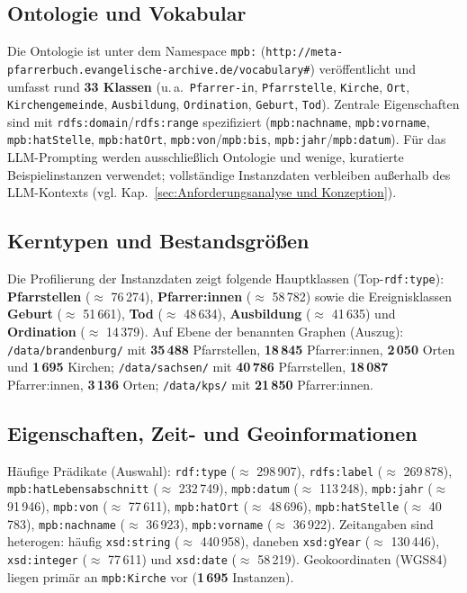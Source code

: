 \subsection*{Ontologie und Vokabular}
Die Ontologie ist unter dem Namespace \texttt{mpb:} (\texttt{http://meta-pfarrerbuch.evangelische-archive.de/vocabulary\#}) veröffentlicht und umfasst rund \textbf{33 Klassen} (u.\,a.\ \texttt{Pfarrer-in}, \texttt{Pfarrstelle}, \texttt{Kirche}, \texttt{Ort}, \texttt{Kirchengemeinde}, \texttt{Ausbildung}, \texttt{Ordination}, \texttt{Geburt}, \texttt{Tod}). Zentrale Eigenschaften sind mit \texttt{rdfs:domain}/\texttt{rdfs:range} spezifiziert (\texttt{mpb:nachname}, \texttt{mpb:vorname}, \texttt{mpb:hatStelle}, \texttt{mpb:hatOrt}, \texttt{mpb:von}/\texttt{mpb:bis}, \texttt{mpb:jahr}/\texttt{mpb:datum}). Für das LLM-Prompting werden ausschließlich Ontologie und wenige, kuratierte Beispielinstanzen verwendet; vollständige Instanzdaten verbleiben außerhalb des LLM-Kontexts (vgl. Kap.~\ref{sec:Anforderungsanalyse und Konzeption}).

\subsection*{Kerntypen und Bestandsgrößen}
Die Profilierung der Instanzdaten zeigt folgende Hauptklassen (Top-\texttt{rdf:type}): \textbf{Pfarrstellen} (\(\approx\) 76\,274), \textbf{Pfarrer:innen} (\(\approx\) 58\,782) sowie die Ereignisklassen \textbf{Geburt} (\(\approx\) 51\,661), \textbf{Tod} (\(\approx\) 48\,634), \textbf{Ausbildung} (\(\approx\) 41\,635) und \textbf{Ordination} (\(\approx\) 14\,379). Auf Ebene der benannten Graphen (Auszug): \texttt{/data/brandenburg/} mit \textbf{35\,488} Pfarrstellen, \textbf{18\,845} Pfarrer:innen, \textbf{2\,050} Orten und \textbf{1\,695} Kirchen; \texttt{/data/sachsen/} mit \textbf{40\,786} Pfarrstellen, \textbf{18\,087} Pfarrer:innen, \textbf{3\,136} Orten; \texttt{/data/kps/} mit \textbf{21\,850} Pfarrer:innen.

\subsection*{Eigenschaften, Zeit- und Geoinformationen}
Häufige Prädikate (Auswahl): \texttt{rdf:type} (\(\approx\) 298\,907), \texttt{rdfs:label} (\(\approx\) 269\,878), \texttt{mpb:hatLebensabschnitt} (\(\approx\) 232\,749), \texttt{mpb:datum} (\(\approx\) 113\,248), \texttt{mpb:jahr} (\(\approx\) 91\,946), \texttt{mpb:von} (\(\approx\) 77\,611), \texttt{mpb:hatOrt} (\(\approx\) 48\,696), \texttt{mpb:hatStelle} (\(\approx\) 40\,783), \texttt{mpb:nachname} (\(\approx\) 36\,923), \texttt{mpb:vorname} (\(\approx\) 36\,922). Zeitangaben sind heterogen: häufig \texttt{xsd:string} (\(\approx\) 440\,958), daneben \texttt{xsd:gYear} (\(\approx\) 130\,446), \texttt{xsd:integer} (\(\approx\) 77\,611) und \texttt{xsd:date} (\(\approx\) 58\,219). Geokoordinaten (WGS84) liegen primär an \texttt{mpb:Kirche} vor (\textbf{1\,695} Instanzen).

